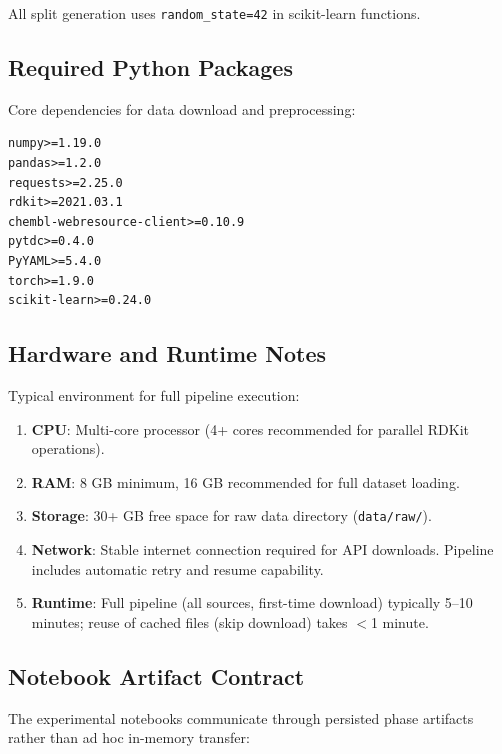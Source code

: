 \documentclass[a4paper,11pt,twoside]{report}
\begin{document}
\noindent All split generation uses \texttt{random\_state=42} in scikit-learn functions.

\subsection*{Required Python Packages}

\noindent Core dependencies for data download and preprocessing:

\begin{verbatim}
numpy>=1.19.0
pandas>=1.2.0
requests>=2.25.0
rdkit>=2021.03.1
chembl-webresource-client>=0.10.9
pytdc>=0.4.0
PyYAML>=5.4.0
torch>=1.9.0
scikit-learn>=0.24.0
\end{verbatim}

\subsection*{Hardware and Runtime Notes}

\noindent Typical environment for full pipeline execution:

\begin{enumerate}
\item \textbf{CPU}: Multi-core processor (4+ cores recommended for parallel RDKit operations).
\item \textbf{RAM}: 8 GB minimum, 16 GB recommended for full dataset loading.
\item \textbf{Storage}: 30+ GB free space for raw data directory (\texttt{data/raw/}).
\item \textbf{Network}: Stable internet connection required for API downloads. Pipeline includes automatic retry and resume capability.
\item \textbf{Runtime}: Full pipeline (all sources, first-time download) typically 5--10 minutes; reuse of cached files (skip download) takes $<$1 minute.
\end{enumerate}

\subsection*{Notebook Artifact Contract}

\noindent The experimental notebooks communicate through persisted phase artifacts rather than ad hoc in-memory transfer:
\end{document}
